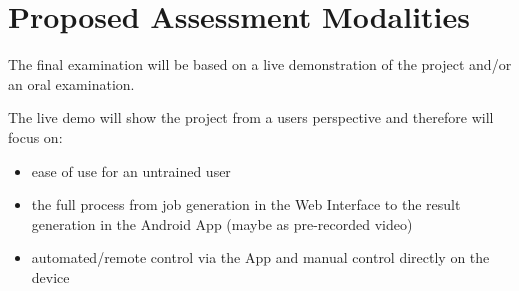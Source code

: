 \documentclass[a4paper,12pt]{article}
\begin{document}
\section*{Proposed Assessment Modalities}
The final examination will be based on a live demonstration of the project and/or an oral examination.

\noindent
The live demo will show the project from a users perspective and therefore will focus on:
\begin{itemize}
    \item ease of use for an untrained user
    \item the full process from job generation in the Web Interface to the result generation in the Android App (maybe as pre-recorded video)
    \item automated/remote control via the App and manual control directly on the device
\end{itemize}
\end{document}

